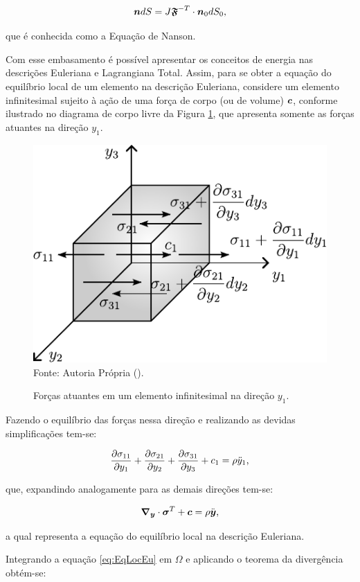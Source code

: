 \begin{equation}
    \boldsymbol{n}dS=J\boldsymbol{\mathfrak{F}}^{-T}\cdot\boldsymbol{n}_0dS_0\text{,}\label{eq:Nanson}
\end{equation}

\noindent que é conhecida como a Equação de Nanson.

Com esse embasamento é possível apresentar os conceitos de energia nas descrições Euleriana e Lagrangiana Total. Assim, para se obter a equação do equilíbrio local de um elemento na descrição Euleriana, considere um elemento infinitesimal sujeito à ação de uma força de corpo (ou de volume) $\boldsymbol{c}$, conforme ilustrado no diagrama de corpo livre da Figura \ref{fig:CorpoLivreSolido}, que apresenta somente as forças atuantes na direção $y_1$.

\begin{figure}[h!]
    \centering
    \caption{Forças atuantes em um elemento infinitesimal na direção $y_1$.}
    \includegraphics[width=.5\linewidth]{Figuras/CorpoLivreSolido.pdf}
    \\Fonte: Autoria Própria (\the\year).
    \label{fig:CorpoLivreSolido}
\end{figure}

Fazendo o equilíbrio das forças nessa direção e realizando as devidas simplificações tem-se:

\[\frac{\partial{\sigma_{11}}}{\partial{y_1}}+\frac{\partial{\sigma_{21}}}{\partial{y_2}}+\frac{\partial{\sigma_{31}}}{\partial{y_3}}+c_1=\rho\ddot{y}_1\text{,}\]

\noindent que, expandindo analogamente para as demais direções tem-se:

\begin{equation}
    \boldsymbol{\nabla_y}\cdot\boldsymbol{\sigma}^T+\boldsymbol{c}=\rho\ddot{\boldsymbol{y}}\text{,}
    \label{eq:EqLocEu}
\end{equation}

\noindent a qual representa a equação do equilíbrio local na descrição Euleriana.

Integrando a equação \eqref{eq:EqLocEu} em $\Omega$ e aplicando o teorema da divergência obtém-se:

